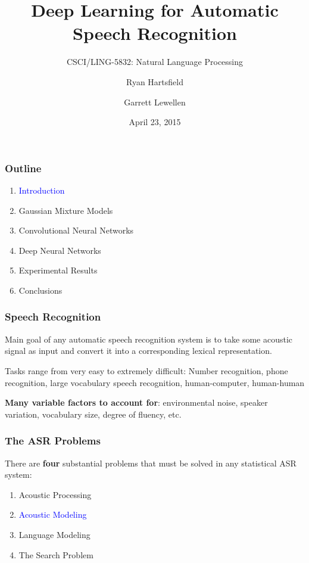 \documentclass[notes]{beamer}
\begin{document}
\title{Deep Learning for Automatic Speech Recognition}
\subtitle{CSCI/LING-5832: Natural Language Processing}
\author{Ryan Hartsfield \and Garrett Lewellen}
\date{April 23, 2015}

\frame{\titlepage}

\begin{frame}
	\frametitle{Outline}
	
	\begin{enumerate}
		\item \textcolor{blue}{Introduction}
		\item Gaussian Mixture Models
		\item Convolutional Neural Networks
		\item Deep Neural Networks
		\item Experimental Results
		\item Conclusions
	\end{enumerate}
\end{frame}
\begin{frame}
	\frametitle{Speech Recognition}
	\begin{center}
		Main goal of any automatic speech recognition system is to take some acoustic signal as input and convert it into a corresponding lexical representation.
	\end{center}
	
	\begin{center}
		Tasks range from very easy to extremely difficult: Number recognition, phone recognition, large vocabulary speech recognition, human-computer, human-human
	\end{center}
	
	\begin{center}
		\textbf{Many variable factors to account for}: environmental noise, speaker variation, vocabulary size, degree of fluency, etc.
	\end{center}
\end{frame}
\begin{frame}
	\frametitle{The ASR Problems}
	\begin{center}
		There are \textbf{four} substantial problems that must be solved in any statistical ASR system:
	\end{center}

	\begin{enumerate}
		\item Acoustic Processing
		\item \textcolor{blue}{Acoustic Modeling}
		\item Language Modeling
		\item The Search Problem
	\end{enumerate}
\end{frame}
\end{document}

